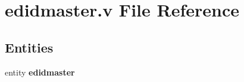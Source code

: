 \section{edidmaster.\-v File Reference}
\label{edidmaster_8v}
\subsection*{Entities}
\begin{DoxyCompactItemize}
\item 
entity {\bf edidmaster}
\end{DoxyCompactItemize}
